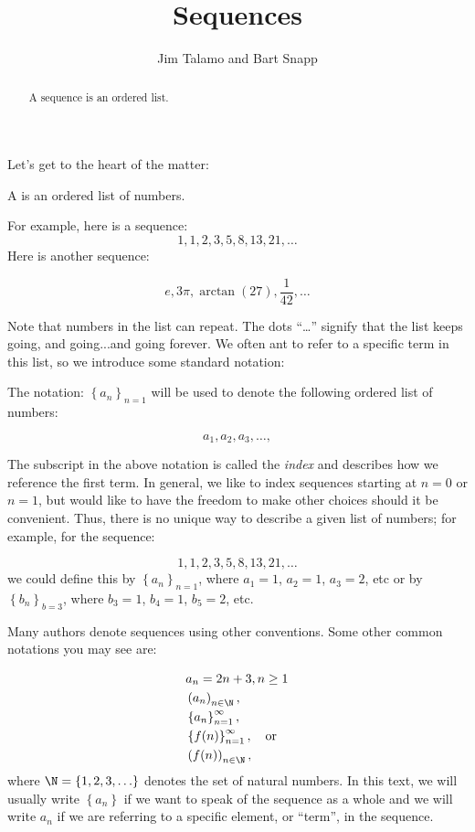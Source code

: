 \documentclass{ximera}
\author{Jim Talamo and Bart Snapp}
\title[Dig-In:]{Sequences}
\begin{document}
\begin{abstract}
  A sequence is an ordered list.
\end{abstract}
\maketitle


Let's get to the heart of the matter:

\begin{definition}
  A  is an ordered list of numbers.
\end{definition}

For example, here is a sequence:
\[
1,1, 2, 3, 5, 8, 13, 21, \ldots
\]
Here is another sequence:

\[
e, 3\pi, \arctan(27), \frac{1}{42}, \ldots
\]


Note that numbers in the list can repeat.  The dots ``\ldots'' signify that the list keeps
going, and going...and going forever.  We often ant to refer to a specific term in this list, so we introduce some standard notation:
\begin{definition} The notation:  $\left\{a_n\right\}_{n=1}$ will be used to denote the following ordered list of numbers:

\[
a_1, a_2,  a_3, \ldots,
\]
\end{definition}

The subscript in the above notation is called the \emph{index} and describes how we reference the first term.  In general, we like to index sequences starting at $n=0$ or $n=1$, but would like to have the freedom to make other choices should it be convenient.  Thus, there is no unique way to describe a given list of numbers; for example, for the sequence:

\[
1,1, 2, 3, 5, 8, 13, 21, \ldots
\]
we could define this by $\left\{a_n\right\}_{n=1}$, where $a_1=1$, $a_2=1$, $a_3=2$, etc or by  $\left\{b_n\right\}_{b=3}$, where $b_3=1$, $b_4=1$, $b_5=2$, etc.

\begin{remark}
Many authors denote sequences using other conventions.  Some other common notations you may see are: 

\begin{align*}
  &a_n = 2n+3, n \geq 1   \\
  & \left(a_n\right)_{n \in \N}, \\
  & \left\{a_n\right\}_{n=1}^\infty, \\
  & \left\{f(n)\right\}_{n=1}^\infty, \quad \text{or} \\
  & \left(f(n)\right)_{n \in \N},
\end{align*}
where $\N = \{1,2,3, \ldots \}$ denotes the set of natural  numbers. In this text, we will usually write $\left\{a_n\right\}$ if we want to speak of the sequence as a whole and we will write $a_n$ if we are referring to a specific element, or ``term'', in the sequence.

\end{remark}
\end{document}
